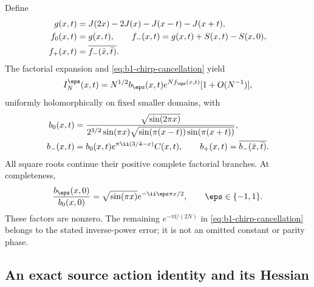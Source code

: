 Define
\begin{align}
 g(x,t)&=J(2x)-2J(x)-J(x-t)-J(x+t),
 \notag\\
 f_0(x,t)&=g(x,t),\qquad
 f_-(x,t)=g(x,t)+S(x,t)-S(x,0),
 \notag\\
 f_+(x,t)&=\overline{f_-(\bar x,\bar t)}.
 \label{eq:b1-local-actions}
\end{align}
The factorial expansion and \eqref{eq:b1-chirp-cancellation} yield
\begin{equation}\label{eq:b1-local-asymptotic}
 I_N^\eps(x,t)=N^{1/2}b_\eps(x,t)e^{Nf_\eps(x,t)}
                                      [1+O(N^{-1})],
\end{equation}
uniformly holomorphically on fixed smaller domains, with
\begin{align}
 b_0(x,t)&=
 \frac{\sqrt{\sin(2\pi x)}}
 {2^{3/2}\sin(\pi x)
       \sqrt{\sin(\pi(x-t))\sin(\pi(x+t))}},
 \notag\\
 b_-(x,t)&=b_0(x,t)e^{\pi\ii(3/4-x)}C(x,t),\qquad
 b_+(x,t)=\overline{b_-(\bar x,\bar t)}.
 \label{eq:b1-local-amplitudes}
\end{align}
All square roots continue their positive complete factorial branches.
At completeness,
\begin{equation}\label{eq:b1-amplitude-at-zero}
 \frac{b_\eps(x,0)}{b_0(x,0)}
 =\sqrt{\sin(\pi x)}e^{-\ii\eps\pi x/2},
 \qquad \eps\in\{-1,1\}.
\end{equation}
These factors are nonzero. The remaining $e^{-\pi\ii/(2N)}$ in
\eqref{eq:b1-chirp-cancellation} belongs to the stated inverse-power
error; it is not an omitted constant or parity phase.

\subsection{An exact source action identity and its Hessian}

